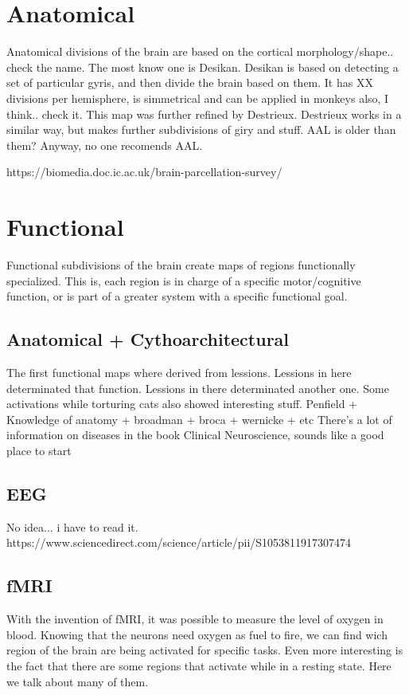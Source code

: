 \section{Anatomical}
Anatomical divisions of the brain are based on the cortical morphology/shape.. check the name.
The most know one is Desikan. Desikan is based on detecting a set of particular
gyris, and then divide the brain based on them. It has XX divisions per
hemisphere, is simmetrical and can be applied in monkeys also, I think.. check it.
This map was further refined by Destrieux. Destrieux works in a similar way,
but makes further subdivisions of giry and stuff. AAL is older than them?
Anyway, no one recomends AAL.

https://biomedia.doc.ic.ac.uk/brain-parcellation-survey/

\section{Functional}

Functional subdivisions of the brain create maps of regions functionally 
specialized. This is, each region is in charge of a specific motor/cognitive
function, or is part of a greater system with a specific functional goal.

\subsection{Anatomical + Cythoarchitectural}
The first functional maps where derived from lessions. Lessions in here
determinated that function. Lessions in there determinated another one.
Some activations while torturing cats also showed interesting stuff.
Penfield + Knowledge of anatomy + broadman + broca + wernicke + etc
There's a lot of information on diseases in the book Clinical Neuroscience,
sounds like a good place to start

\subsection{EEG}
No idea... i have to read it.
https://www.sciencedirect.com/science/article/pii/S1053811917307474

\subsection{fMRI}
With the invention of fMRI, it was possible to measure the level of oxygen
in blood. Knowing that the neurons need oxygen as fuel to fire, we can
find wich region of the brain are being activated for specific tasks.
Even more interesting is the fact that there are some regions that activate
while in a resting state. Here we talk about many of them.

